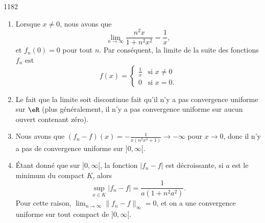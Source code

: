

\begin{corrige}{1182}

\begin{enumerate}
\item Lorsque $x\neq 0$, nous avons que
\begin{equation}
	\lim_{n\to\infty}\frac{ n^2x }{ 1+n^2x^2 }=\frac{1}{ x },
\end{equation}
et $f_n(0)=0$ pour tout $n$. Par conséquent, la limite de la suite des fonctions $f_n$ est
\begin{equation}
	f(x)=
\begin{cases}
	\frac{1}{ x }	&	\text{si }x\neq 0\\
	0	&	 \text{si }x=0.
\end{cases}
\end{equation}
\item 
Le fait que la limite soit discontinue fait qu'il n'y a pas convergence uniforme sur $\eR$ (plus généralement, il n'y a pas convergence uniforme sur aucun ouvert contenant zéro).

\item Nous avons que $(f_n-f)(x)=-\frac{1}{ x(n^2x^2+1) }\to-\infty$ pour $x\to 0$, donc il n'y a pas de convergence uniforme sur $]0,\infty[$.

\item Étant donné que sur $]0,\infty[$, la fonction $| f_{n}-f |$ est décroissante, si $a$ est le minimum du compact $K$, alors
\begin{equation}
	\sup_{x\in K}| f_n-f |=\frac{ 1 }{ a(1+n^2a^2) }.
\end{equation}
Pour cette raison, $\lim_{n \to\infty}\| f_n-f \|_{\infty}=0$, et on a une convergence uniforme sur tout compact de $]0,\infty[$.
\end{enumerate}


\end{corrige}
